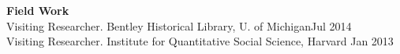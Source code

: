 \begin{minipage}{\linewidth}
\textbf{Field Work}\\
Visiting Researcher. Bentley Historical Library, U. of Michigan\hfill{Jul 2014}\smallskip\\
Visiting Researcher. Institute for Quantitative Social Science, Harvard \hfill{Jan 2013}%
\end{minipage}